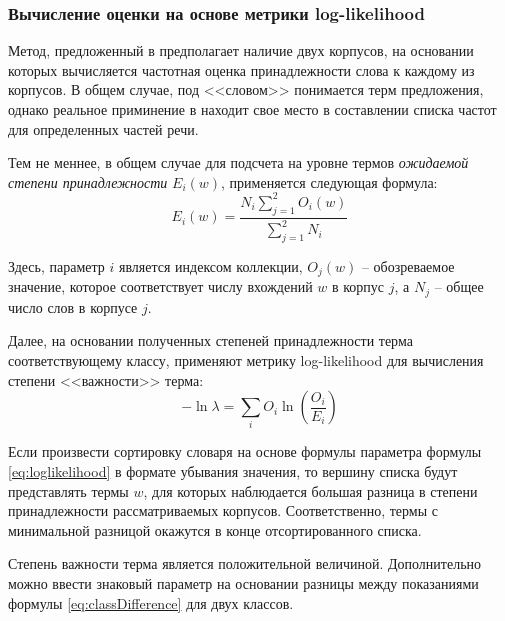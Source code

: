         \subsubsection{Вычисление оценки на основе метрики log-likelihood}
        Метод, предложенный в \cite{lexiconLL} предполагает наличие двух корпусов, на основании
        которых вычисляется частотная оценка принадлежности слова к каждому из корпусов.
        В общем случае, под <<словом>> понимается терм предложения, однако
        реальное приминение в \cite{lexiconLL} находит свое место в составлении
        списка частот для определенных частей речи.

        Тем не меннее, в общем случае для подсчета на уровне термов {\it ожидаемой
        степени принадлежности} $E_i(w)$, применяется следующая формула:
        \begin{equation}
            \label{eq:classDifference}
            E_i(w) = \dfrac{N_i\sum\limits_{j=1}^{2}O_i(w)}{\sum\limits_{j=1}^{2}N_i}
        \end{equation}

        Здесь, параметр $i$ является индексом коллекции, $O_j(w)$ -- обозреваемое
        значение, которое соответствует числу вхождений $w$ в корпус $j$, а $N_j$
        -- общее число слов в корпусе $j$.

        Далее, на основании полученных степеней принадлежности терма соответствующему
        классу, применяют метрику log-likelihood для вычисления степени <<важности>>
        терма:
        \begin{equation}
            \label{eq:loglikelihood}
            - \ln \lambda = \sum\limits_i O_i \ln \left( \dfrac{O_i}{E_i} \right)
        \end{equation}

        Если произвести сортировку словаря на основе формулы параметра формулы
        \ref{eq:loglikelihood} в формате убывания значения, то вершину списка
        будут представлять термы $w$, для которых наблюдается большая разница в
        степени принадлежности рассматриваемых корпусов. Соответственно, термы
        с минимальной разницой окажутся в конце отсортированного списка.

        Степень важности терма является положительной величиной. Дополнительно можно
        ввести знаковый параметр на основании разницы между показаниями формулы
        \ref{eq:classDifference} для двух классов.

